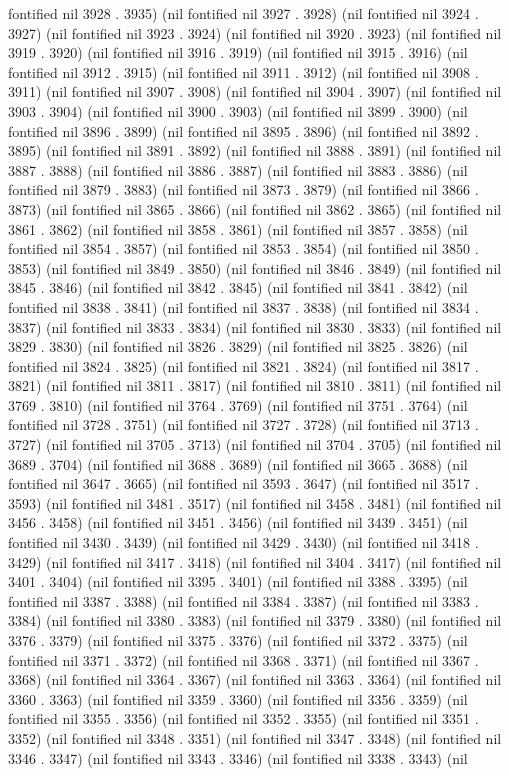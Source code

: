 fontified nil 3928 . 3935) (nil fontified nil 3927 . 3928) (nil fontified nil 3924 . 3927) (nil fontified nil 3923 . 3924) (nil fontified nil 3920 . 3923) (nil fontified nil 3919 . 3920) (nil fontified nil 3916 . 3919) (nil fontified nil 3915 . 3916) (nil fontified nil 3912 . 3915) (nil fontified nil 3911 . 3912) (nil fontified nil 3908 . 3911) (nil fontified nil 3907 . 3908) (nil fontified nil 3904 . 3907) (nil fontified nil 3903 . 3904) (nil fontified nil 3900 . 3903) (nil fontified nil 3899 . 3900) (nil fontified nil 3896 . 3899) (nil fontified nil 3895 . 3896) (nil fontified nil 3892 . 3895) (nil fontified nil 3891 . 3892) (nil fontified nil 3888 . 3891) (nil fontified nil 3887 . 3888) (nil fontified nil 3886 . 3887) (nil fontified nil 3883 . 3886) (nil fontified nil 3879 . 3883) (nil fontified nil 3873 . 3879) (nil fontified nil 3866 . 3873) (nil fontified nil 3865 . 3866) (nil fontified nil 3862 . 3865) (nil fontified nil 3861 . 3862) (nil fontified nil 3858 . 3861) (nil fontified nil 3857 . 3858) (nil fontified nil 3854 . 3857) (nil fontified nil 3853 . 3854) (nil fontified nil 3850 . 3853) (nil fontified nil 3849 . 3850) (nil fontified nil 3846 . 3849) (nil fontified nil 3845 . 3846) (nil fontified nil 3842 . 3845) (nil fontified nil 3841 . 3842) (nil fontified nil 3838 . 3841) (nil fontified nil 3837 . 3838) (nil fontified nil 3834 . 3837) (nil fontified nil 3833 . 3834) (nil fontified nil 3830 . 3833) (nil fontified nil 3829 . 3830) (nil fontified nil 3826 . 3829) (nil fontified nil 3825 . 3826) (nil fontified nil 3824 . 3825) (nil fontified nil 3821 . 3824) (nil fontified nil 3817 . 3821) (nil fontified nil 3811 . 3817) (nil fontified nil 3810 . 3811) (nil fontified nil 3769 . 3810) (nil fontified nil 3764 . 3769) (nil fontified nil 3751 . 3764) (nil fontified nil 3728 . 3751) (nil fontified nil 3727 . 3728) (nil fontified nil 3713 . 3727) (nil fontified nil 3705 . 3713) (nil fontified nil 3704 . 3705) (nil fontified nil 3689 . 3704) (nil fontified nil 3688 . 3689) (nil fontified nil 3665 . 3688) (nil fontified nil 3647 . 3665) (nil fontified nil 3593 . 3647) (nil fontified nil 3517 . 3593) (nil fontified nil 3481 . 3517) (nil fontified nil 3458 . 3481) (nil fontified nil 3456 . 3458) (nil fontified nil 3451 . 3456) (nil fontified nil 3439 . 3451) (nil fontified nil 3430 . 3439) (nil fontified nil 3429 . 3430) (nil fontified nil 3418 . 3429) (nil fontified nil 3417 . 3418) (nil fontified nil 3404 . 3417) (nil fontified nil 3401 . 3404) (nil fontified nil 3395 . 3401) (nil fontified nil 3388 . 3395) (nil fontified nil 3387 . 3388) (nil fontified nil 3384 . 3387) (nil fontified nil 3383 . 3384) (nil fontified nil 3380 . 3383) (nil fontified nil 3379 . 3380) (nil fontified nil 3376 . 3379) (nil fontified nil 3375 . 3376) (nil fontified nil 3372 . 3375) (nil fontified nil 3371 . 3372) (nil fontified nil 3368 . 3371) (nil fontified nil 3367 . 3368) (nil fontified nil 3364 . 3367) (nil fontified nil 3363 . 3364) (nil fontified nil 3360 . 3363) (nil fontified nil 3359 . 3360) (nil fontified nil 3356 . 3359) (nil fontified nil 3355 . 3356) (nil fontified nil 3352 . 3355) (nil fontified nil 3351 . 3352) (nil fontified nil 3348 . 3351) (nil fontified nil 3347 . 3348) (nil fontified nil 3346 . 3347) (nil fontified nil 3343 . 3346) (nil fontified nil 3338 . 3343) (nil 